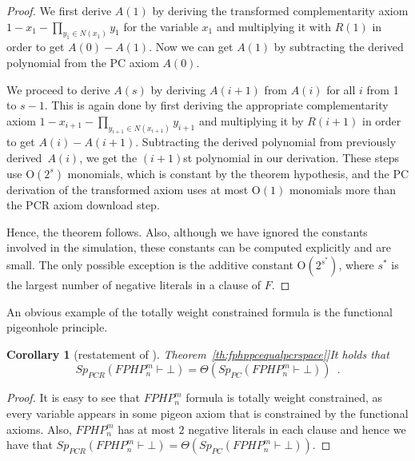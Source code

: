 \documentclass[11pt]{article}
\numberwithin{equation}{section}
\newtheorem{corollary}[theorem]{Corollary}
\theoremstyle{definition}
\theoremstyle{plain}
\newcommand{\expref}[2]{\hyperref[#2]{#1~\ref{#2}}}
\theoremstyle{plain}
\theoremstyle{definition}
\newcommand{\refth}[1]{\expref{Theorem}{#1}}
\newcommand{\bigoh}[1]{\mathrm{O} ( #1 )}
\newcommand{\bigtheta}[1]{\Theta ( #1 )}
\newcommand{\eqperiod}{\enspace .}
\newcommand{\derivabbrevsmall}[2]{( #1 \vdash #2 )}
\newcommand{\refutabbrevsmall}[1]{\derivabbrevsmall{#1}{\!\bot}}
\newcommand{\genericrefsmall}[3]{{\mathit{#1}}_{#2}\refutabbrevsmall{#3}}
\newcommand{\mspaceref}[2][]{\genericrefsmall{Sp}{#1}{#2}}
\newcommand{\formulaformat}[1]{\mathit{#1}}
\newcommand{\fphpnot}[2]{\formulaformat{FPHP}^{#1}_{#2}}
\newcommand{\varweightconstrained}{totally weight constrained\xspace}
\newcommand{\varneighbors}[1]{N(#1)}
\newcommand{\negativeaxiomiter}[1]{A(#1)}
\newcommand{\remainingpoly}[1]{R(#1)}
\begin{document}
\begin{proof}
  We first derive $\negativeaxiomiter{1}$ by deriving the transformed
  complementarity axiom $1 - x_1 - \prod_{y_1 \in \varneighbors{x_1}}
  y_1$ for the variable $x_1$ and multiplying it with
  $\remainingpoly{1}$ in order to get
  $\negativeaxiomiter{0} - \negativeaxiomiter{1}$. Now we can get
  $\negativeaxiomiter{1}$ by subtracting the derived polynomial from
  the PC axiom $\negativeaxiomiter{0}$.


  We proceed to derive $\negativeaxiomiter{s}$ by deriving
  $\negativeaxiomiter{i + 1}$ from $\negativeaxiomiter{i}$ for all $i$
  from 1 to $s - 1$. This is again done by first deriving the
  appropriate complementarity axiom $1 - x_{i + 1} - \prod_{y_{i + 1}
    \in \varneighbors{x_{i + 1}}} y_{i + 1}$ and multiplying it by
  $\remainingpoly{i + 1}$ in order to get
  $\negativeaxiomiter{i} - \negativeaxiomiter{i + 1}$. Subtracting the
  derived polynomial from previously derived~$\negativeaxiomiter{i}$,
  we get the $(i + 1)$st polynomial in our derivation. These steps use
  $\bigoh{2^{s}}$ monomials, which is constant by the theorem hypothesis,
  and the PC derivation of the transformed axiom uses at most
  $\bigoh{1}$ monomials more than the PCR axiom download step.

  Hence, the theorem follows. Also, although we have ignored the
  constants involved in the simulation, these constants can be
  computed explicitly and are small. The only possible exception is
  the additive constant $\bigoh{2^{s^{*}}}$, where $s^{*}$ is the
  largest number of negative literals in a clause of $F$.
\end{proof}

An obvious example of the \varweightconstrained{} formula is the
functional pigeonhole principle.

\begin{corollary}[restatement %
  of \refth{th:fphppcequalpcrspace}]\label{cor:fphppcequalpcrspace}
  It holds that
  \begin{equation*}
    \mspaceref[PCR]{\fphpnot{m}{n}} = \bigtheta{\mspaceref[PC]{\fphpnot{m}{n}}} \eqperiod
  \end{equation*}
\end{corollary}
\begin{proof}
  It is easy to see that $\fphpnot{m}{n}$ formula is
  \varweightconstrained{}, as every variable appears in some pigeon
  axiom that is constrained by the functional axioms. Also,
  $\fphpnot{m}{n}$ has at most $2$ negative literals in each clause
  and hence we have that $\mspaceref[PCR]{\fphpnot{m}{n}} =
  \bigtheta{\mspaceref[PC]{\fphpnot{m}{n}}}$.
\end{proof}
\end{document}
